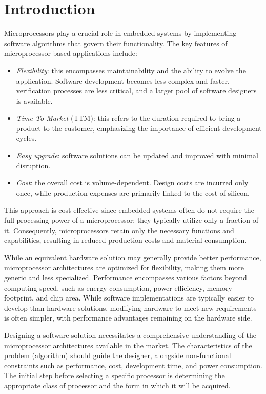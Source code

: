 \section{Introduction}

Microprocessors play a crucial role in embedded systems by implementing software algorithms that govern their functionality. 
The key features of microprocessor-based applications include:
\begin{itemize}
    \item \textit{Flexibility}: this encompasses maintainability and the ability to evolve the application. 
        Software development becomes less complex and faster, verification processes are less critical, and a larger pool of software designers is available.
    \item \textit{Time To Market} (TTM): this refers to the duration required to bring a product to the customer, emphasizing the importance of efficient development cycles.
    \item \textit{Easy upgrade}: software solutions can be updated and improved with minimal disruption.
    \item \textit{Cost}: the overall cost is volume-dependent. 
        Design costs are incurred only once, while production expenses are primarily linked to the cost of silicon.
\end{itemize}
This approach is cost-effective since embedded systems often do not require the full processing power of a microprocessor; they typically utilize only a fraction of it. 
Consequently, microprocessors retain only the necessary functions and capabilities, resulting in reduced production costs and material consumption.

While an equivalent hardware solution may generally provide better performance, microprocessor architectures are optimized for flexibility, making them more generic and less specialized. 
Performance encompasses various factors beyond computing speed, such as energy consumption, power efficiency, memory footprint, and chip area. 
While software implementations are typically easier to develop than hardware solutions, modifying hardware to meet new requirements is often simpler, with performance advantages remaining on the hardware side.

Designing a software solution necessitates a comprehensive understanding of the microprocessor architectures available in the market. 
The characteristics of the problem (algorithm) should guide the designer, alongside non-functional constraints such as performance, cost, development time, and power consumption. 
The initial step before selecting a specific processor is determining the appropriate class of processor and the form in which it will be acquired.